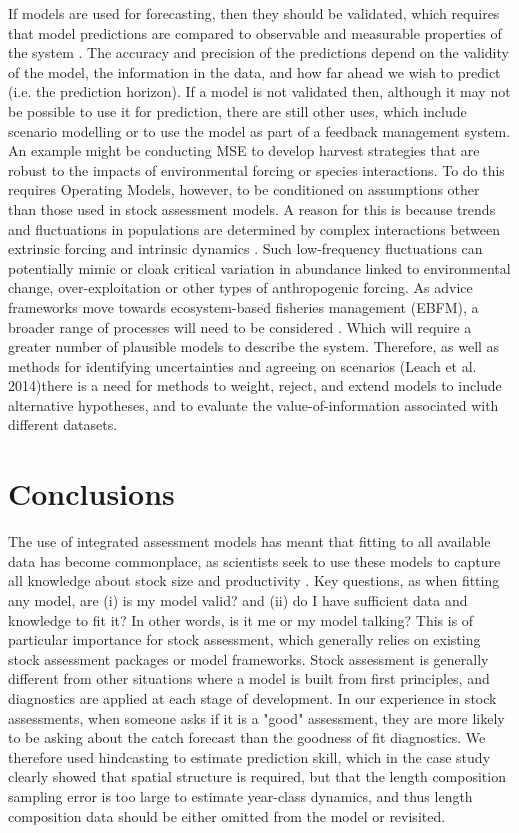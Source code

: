 \documentclass[12pt,halfline,a4paper,nonumbib]{ouparticle}
\begin{document}
If models are used for forecasting, then they should be validated, which requires that model predictions are compared to observable and measurable properties of the system \parencite{ianelli2016multi}. The accuracy and precision of the predictions depend on the validity of the model, the information in the data, and how far ahead we wish to predict (i.e. the prediction horizon). If a model is not validated then, although it may not be possible to use it for prediction, there are still other uses, which include scenario modelling or to use the model as part of a feedback management system. An example might be conducting MSE to develop harvest strategies that are robust to the impacts of environmental forcing or species interactions. To do this requires Operating Models, however, to be conditioned on assumptions other than those used in stock assessment models. A reason for this is because trends and fluctuations in populations are determined by complex interactions between extrinsic forcing and intrinsic dynamics \parencite{bjoernstad2004trends, botsford2014cohort}. Such low-frequency fluctuations can potentially mimic or cloak critical variation in abundance linked to environmental change, over-exploitation or other types of anthropogenic forcing. As advice frameworks move towards ecosystem-based fisheries management (EBFM), a broader range of processes will need to be considered \parencite{ianelli2016multi}. Which will require a greater number of plausible models to describe the system. Therefore, as well as methods for identifying uncertainties and agreeing on scenarios (Leach et al. 2014)there is a need for methods to weight, reject, and extend models to include alternative hypotheses, and to evaluate the value-of-information associated with different datasets.


\section{Conclusions}

 The use of integrated assessment models has meant that fitting to all available data has become commonplace, as scientists seek to use these models to capture all knowledge about stock size and productivity \parencite{hilborn2003state}. Key questions, as when fitting any model, are (i) is my model valid? and (ii) do I have sufficient data and knowledge to fit it? In other words, is it me or my model talking? This is of particular importance for stock assessment, which generally relies on existing stock assessment packages or model frameworks. Stock assessment is generally different from other situations where a model is built from first principles, and diagnostics are applied at each stage of development. In our experience in stock assessments, when someone asks if it is a "good" assessment, they are more likely to be asking about the catch forecast than the goodness of fit diagnostics. We therefore used hindcasting to estimate prediction skill, which in the case study clearly showed that spatial structure is required, but that the length composition sampling error is too large to estimate year-class dynamics, and thus length composition data should be either omitted from the model or revisited.
 
\end{document}
